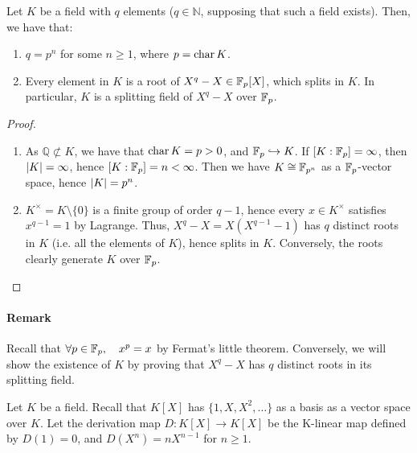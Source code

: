 \begin{lemma}
  \label{lemma:59}
  Let $K$ be a field with $q$ elements ($q \in \mathbb{N}$, supposing that such a field exists). Then, we have that:
  \begin{enumerate}
  \item $q = p^n$ for some $n \geq 1$, where $p = \operatorname{char} K$. 
  \item Every element in $K$ is a root of $X^q -X \in \mathbb{F}_{p}[X]$, which splits in $K$. In particular, $K$ is a splitting field of $X^q-X$ over $\mathbb{F}_{p}$.
  \end{enumerate}
\end{lemma}

\begin{proof}
  \begin{enumerate}
  \item As $\mathbb{Q} \not\subset K$, we have that $\operatorname{char} K = p > 0$, and $\mathbb{F}_{p} \hookrightarrow K$. If $[K : \mathbb{F}_{p}] = \infty$, then $\left|K\right| = \infty$, hence $[K : \mathbb{F}_{p}] = n < \infty$. Then we have $K \cong \mathbb{F}_{p^n}$ as a $\mathbb{F}_{p}$-vector space, hence $\left|K\right| = p^n$.
  \item $K^\times = K \setminus \{ 0 \}$ is a finite group of order $q-1$, hence every $x \in K^\times$ satisfies $x^{q-1} = 1$ by Lagrange. Thus, $X^q-X = X(X^{q-1} - 1)$ has $q$ distinct roots in $K$ (i.e. all the elements of $K$), hence splits in $K$. Conversely, the roots clearly generate $K$ over $\mathbb{F}_{p}$.
  \end{enumerate}
\end{proof}

\paragraph{Remark}

Recall that $\forall p \in \mathbb{F}_{p}, \quad x^p = x$ by Fermat's little theorem. Conversely, we will show the existence of $K$ by proving that $X^q - X$ has $q$ distinct roots in its splitting field.

\begin{definition}
  \label{def:60}
  Let $K$ be a field. Recall that $K[X]$ has $\{ 1, X, X^2, \ldots\}$ as a basis as a vector space over $K$. Let the derivation map $D : K[X] \rightarrow K[X]$ be the K-linear map defined by $D(1) = 0$, and $D(X^n) = nX^{n-1}$ for $n\geq 1$.
\end{definition}

